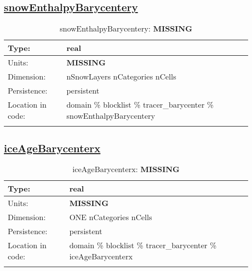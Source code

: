 \subsection[snowEnthalpyBarycentery]{\hyperref[sec:var_tab_tracer_barycenter]{snowEnthalpyBarycentery}}
\label{subsec:var_sec_tracer_barycenter_snowEnthalpyBarycentery}
\begin{center}
\begin{longtable}{| p{2.0in} | p{4.0in} |}
        \hline 
        Type: & real \\
        \hline 
        Units: & {\bf \color{red} MISSING} \\
        \hline 
        Dimension: & nSnowLayers nCategories nCells \\
        \hline 
        Persistence: & persistent \\
        \hline 
         Location in code: & domain \% blocklist \% tracer\_barycenter \% snowEnthalpyBarycentery \\
         \hline 
    \caption{snowEnthalpyBarycentery: {\bf \color{red} MISSING}}
\end{longtable}
\end{center}
\subsection[iceAgeBarycenterx]{\hyperref[sec:var_tab_tracer_barycenter]{iceAgeBarycenterx}}
\label{subsec:var_sec_tracer_barycenter_iceAgeBarycenterx}
\begin{center}
\begin{longtable}{| p{2.0in} | p{4.0in} |}
        \hline 
        Type: & real \\
        \hline 
        Units: & {\bf \color{red} MISSING} \\
        \hline 
        Dimension: & ONE nCategories nCells \\
        \hline 
        Persistence: & persistent \\
        \hline 
         Location in code: & domain \% blocklist \% tracer\_barycenter \% iceAgeBarycenterx \\
         \hline 
    \caption{iceAgeBarycenterx: {\bf \color{red} MISSING}}
\end{longtable}
\end{center}
